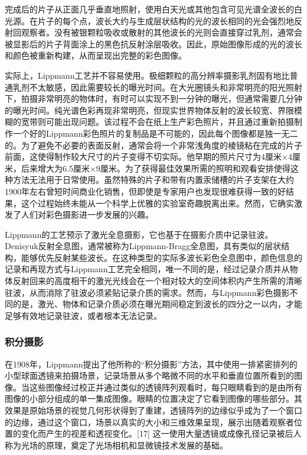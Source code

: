 完成后的片子从正面几乎垂直地照射，使用白天光或其他包含可见光谱全波长的白光源。在片子的每个点，波长大约与生成层状结构的光的波长相同的光会强烈地反射回观察者。没有被银颗粒吸收或散射的其他波长的光则会直接穿过乳剂，通常会被显影后的片子背面涂上的黑色抗反射涂层吸收。因此，原始图像形成的光的波长和颜色被重新构建，从而呈现出完整的彩色图像。

实际上，Lippmann工艺并不容易使用。极细颗粒的高分辨率摄影乳剂固有地比普通乳剂不太敏感，因此需要较长的曝光时间。在大光圈镜头和非常明亮的阳光照射下，拍摄非常明亮的物体时，有时可以实现不到一分钟的曝光，但通常需要几分钟的曝光时间。纯光谱色彩再现非常明亮，但现实世界物体反射的波长较宽、界限模糊的宽带则可能出现问题。该过程不会在纸上生产彩色照片，并且通过重新拍摄制作一个好的Lippmann彩色照片的复制品是不可能的，因此每个图像都是独一无二的。为了避免不必要的表面反射，通常会将一个非常浅角度的棱镜粘在完成的片子前面，这使得制作较大尺寸的片子变得不切实际。他早期的照片尺寸为4厘米×4厘米，后来增大为6.5厘米×9厘米。为了获得最佳效果所需的照明和观看安排使得这种方法无法用于日常使用。虽然特殊的片子和带有内置汞储槽的片子支架在大约1900年左右曾短时间商业化销售，但即使是专家用户也发现很难获得一致的好结果，这个过程始终未能从一个科学上优雅的实验室奇趣脱离出来。然而，它确实激发了人们对彩色摄影进一步发展的兴趣。

Lippmann的工艺预示了激光全息摄影，它也基于在摄影介质中记录驻波。Denisyuk反射全息图，通常被称为Lippmann-Bragg全息图，具有类似的层状结构，能够优先反射某些波长。在这种类型的实际多波长彩色全息图中，颜色信息的记录和再现方式与Lippmann工艺完全相同，唯一不同的是，经过记录介质并从物体反射回来的高度相干的激光光线会在一个相对较大的空间体积内产生所需的清晰驻波，从而消除了驻波必须紧贴记录介质的需求。然而，与Lippmann彩色摄影不同的是，激光、物体和记录介质必须在曝光期间稳定到波长的四分之一以内，才能足够有效地记录驻波，或者根本无法记录。
\subsubsection{积分摄影}
在1908年，Lippmann提出了他所称的“积分摄影”方法，其中使用一排紧密排列的小型球面透镜来拍摄场景，记录场景从多个略微不同的水平和垂直位置所看到的图像。当这些图像经过校正并通过类似的透镜阵列观看时，每只眼睛看到的是由所有图像的小部分组成的单一集成图像。眼睛的位置决定了它看到图像的哪些部分。其效果是原始场景的视觉几何形状得到了重建，透镜阵列的边缘似乎成为了一个窗口的边缘，通过这个窗口，场景以真实的大小和三维效果呈现，展示出随着观察者位置的变化而产生的视差和透视变化。[17] 这一使用大量透镜或成像孔径记录被后人称为光场的原理，奠定了光场相机和显微镜技术发展的基础。

